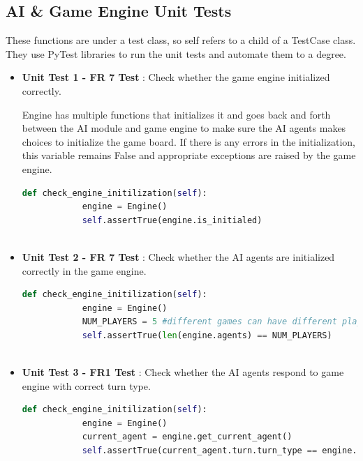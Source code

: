 \documentclass[12pt, titlepage]{article}
\providecommand{\DIFaddtex}[1]{{\protect\color{blue}\uwave{#1}}} %
\providecommand{\DIFaddbegin}{} %
\providecommand{\DIFaddend}{} %
\providecommand{\DIFadd}[1]{\texorpdfstring{\DIFaddtex{#1}}{#1}} %
\begin{document}
\subsection{AI & Game Engine Unit Tests}
These functions are under a test class, so self refers to a child of a TestCase class. They use PyTest libraries to run the unit tests and automate them to a degree.
\begin{itemize}
    \item \textbf{Unit Test 1 - FR 7 Test \DIFaddbegin \DIFadd{(\ref{FRT7})}\DIFaddend }: Check whether the game engine initialized correctly. 

 Engine has multiple functions that initializes it and goes back and forth between the AI module and game engine to make sure the AI agents makes choices to initialize the game board. If there is any errors in the initialization, this variable remains False and appropriate exceptions are raised by the game engine.
    \begin{lstlisting}[language=Python]
        def check_engine_initilization(self):
            engine = Engine()
            self.assertTrue(engine.is_initialed)
    
\end{lstlisting}

    \item \textbf{Unit Test 2 - FR 7 Test \DIFaddbegin \DIFadd{(\ref{FRT7})}\DIFaddend }: Check whether the AI agents are initialized correctly in the game engine.

    \begin{lstlisting}[language=Python]
        def check_engine_initilization(self):
            engine = Engine()
            NUM_PLAYERS = 5 #different games can have different players
            self.assertTrue(len(engine.agents) == NUM_PLAYERS)
    
\end{lstlisting}

    \item \textbf{Unit Test 3 - FR1 Test \DIFaddbegin \DIFadd{(\ref{FRT1})}\DIFaddend }: Check whether the AI agents respond to game engine with correct turn type.

    \begin{lstlisting}[language=Python]
        def check_engine_initilization(self):
            engine = Engine()
            current_agent = engine.get_current_agent()
            self.assertTrue(current_agent.turn.turn_type == engine.turn.turn_type)
    
\end{lstlisting}


\end{itemize}
\end{document}
